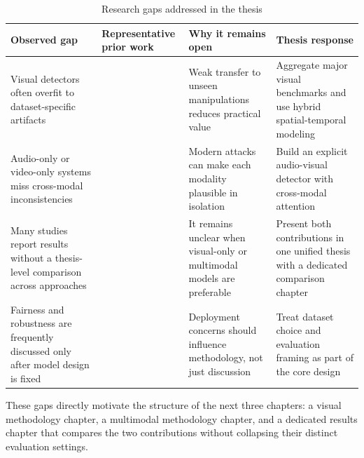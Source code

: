 \begin{table}[H]
\centering
\caption{Research gaps addressed in the thesis}
\label{tab:research-gap}
\begin{tabular}{p{}p{}p{}p{}}
\toprule
\textbf{Observed gap} & \textbf{Representative prior work} & \textbf{Why it remains open} & \textbf{Thesis response} \\
\midrule
Visual detectors often overfit to dataset-specific artifacts & \cite{afchar2018mesonet,nguyen2019capsule,huang2024spatiotemporal} & Weak transfer to unseen manipulations reduces practical value & Aggregate major visual benchmarks and use hybrid spatial-temporal modeling \\
Audio-only or video-only systems miss cross-modal inconsistencies & \cite{parikh2023audio,Yang2023,Haliassos2022} & Modern attacks can make each modality plausible in isolation & Build an explicit audio-visual detector with cross-modal attention \\
Many studies report results without a thesis-level comparison across approaches & \cite{lewis2020deepfake,antad2024hybrid,Katamneni2024} & It remains unclear when visual-only or multimodal models are preferable & Present both contributions in one unified thesis with a dedicated comparison chapter \\
Fairness and robustness are frequently discussed only after model design is fixed & \cite{Ju2024Fairness,Kim2024Freq,fu2025unbiased} & Deployment concerns should influence methodology, not just discussion & Treat dataset choice and evaluation framing as part of the core design \\
\bottomrule
\end{tabular}
\end{table}

These gaps directly motivate the structure of the next three chapters: a visual methodology chapter, a multimodal methodology chapter, and a dedicated results chapter that compares the two contributions without collapsing their distinct evaluation settings.